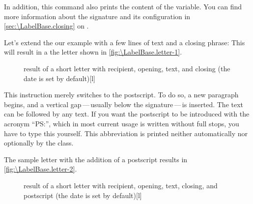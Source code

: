 In addition, this command also prints the content of the
 variable. You can find more
information about the signature and its configuration in
\autoref{sec:\LabelBase.closing} on
.

\begin{Example}
  Let's extend the our example with a few lines of text and a closing phrase:
  This will result in a the letter shown in \autoref{fig:\LabelBase.letter-1}.
  \begin{figure}
    \setcapindent{0pt}%
    \begin{captionbeside}{%
        result of a short letter with recipient, opening, text, and closing
        (the date is set by default)}[l]
    \end{captionbeside}
    \label{fig:\LabelBase.letter-1}
  \end{figure}
\end{Example}
%
\EndIndexGroup

\begin{Declaration}
\end{Declaration}%
This instruction merely switches to the postscript. To do so, a new paragraph
begins, and a vertical gap\,---\,usually below the signature\,---\,is
inserted. The  text can be followed by any text. If you want the
postscript to be introduced with the acronym ``PS:'', which in most current
usage is written without full stops, you have to type this yourself. This
abbreviation is printed neither automatically nor optionally by the
 class.

\begin{Example}
  The sample letter with the addition of a postscript
  results in \autoref{fig:\LabelBase.letter-2}.
  \begin{figure}
    \setcapindent{0pt}%
    \begin{captionbeside}{%
        result of a short letter with recipient, opening, text, closing, and
        postscript (the date is set by default)}[l]
    \end{captionbeside}
    \label{fig:\LabelBase.letter-2}
  \end{figure}
\end{Example}

